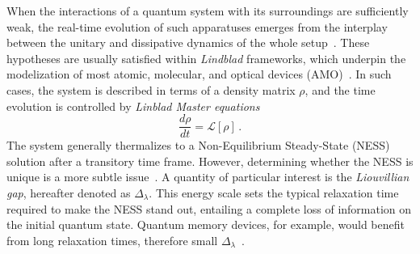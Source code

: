 When the interactions of a quantum system with its surroundings are sufficiently weak, the real-time evolution of such apparatuses emerges from the interplay between the unitary and dissipative dynamics of the whole setup~\cite{RV-2021-coherentanddissipativedynamicsreview}. These hypotheses are usually satisfied within \textit{Lindblad} frameworks, which underpin the modelization of most atomic, molecular, and optical devices (AMO)~\cite{BDS-2015-KeldyshOptical}. In such cases, the system is described in terms of a density matrix $\rho$, and the time evolution is controlled by \textit{Linblad Master equations}
\begin{equation}
    \frac{d\rho}{dt} = \mathcal{L}[\rho]\,.
    \label{eq_def_intro_lindblad}
\end{equation}
The system generally thermalizes to a Non-Equilibrium Steady-State (NESS) solution after a transitory time frame. However, determining whether the NESS is unique is a more subtle issue~\cite{N-2019-uniquenesslindblad, SW-2010-openuniquesolution}. A quantity of particular interest is the \textit{Liouvillian gap}, hereafter denoted as $\Delta_\lambda$. This energy scale sets the typical relaxation time required to make the NESS stand out, entailing a complete loss of information on the initial quantum state. Quantum memory devices, for example, would benefit from long relaxation times, therefore small $\Delta_\lambda$~\cite{CCP-2011-quantummemories}.

